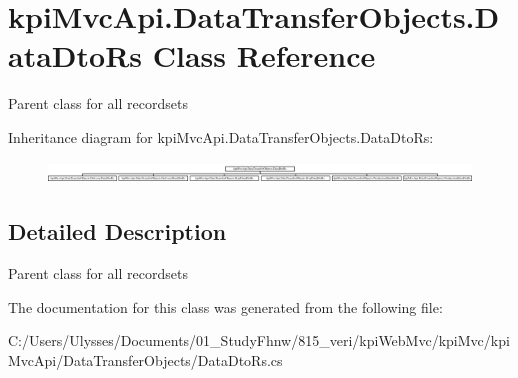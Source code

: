 \hypertarget{classkpi_mvc_api_1_1_data_transfer_objects_1_1_data_dto_rs}{}\section{kpi\+Mvc\+Api.\+Data\+Transfer\+Objects.\+Data\+Dto\+Rs Class Reference}
\label{classkpi_mvc_api_1_1_data_transfer_objects_1_1_data_dto_rs}


Parent class for all recordsets  


Inheritance diagram for kpi\+Mvc\+Api.\+Data\+Transfer\+Objects.\+Data\+Dto\+Rs\+:\begin{figure}[H]
\begin{center}
\leavevmode
\includegraphics[height=0.574359cm]{classkpi_mvc_api_1_1_data_transfer_objects_1_1_data_dto_rs}
\end{center}
\end{figure}


\subsection{Detailed Description}
Parent class for all recordsets 



The documentation for this class was generated from the following file\+:\begin{DoxyCompactItemize}
\item 
C\+:/\+Users/\+Ulysses/\+Documents/01\+\_\+\+Study\+Fhnw/815\+\_\+veri/kpi\+Web\+Mvc/kpi\+Mvc/kpi\+Mvc\+Api/\+Data\+Transfer\+Objects/Data\+Dto\+Rs.\+cs\end{DoxyCompactItemize}
